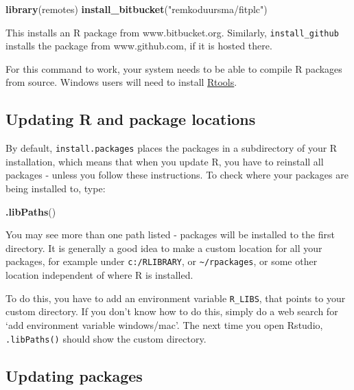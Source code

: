 \documentclass[]{book}
\newenvironment{Shaded}{\begin{snugshade}}{\end{snugshade}}
\newcommand{\KeywordTok}[1]{\textcolor[rgb]{0.13,0.29,0.53}{\textbf{#1}}}
\newcommand{\NormalTok}[1]{#1}
\newcommand{\StringTok}[1]{\textcolor[rgb]{0.31,0.60,0.02}{#1}}
\begin{document}
\begin{Shaded}
\begin{Highlighting}[]
\KeywordTok{library}\NormalTok{(remotes)}
\KeywordTok{install_bitbucket}\NormalTok{(}\StringTok{"remkoduursma/fitplc"}\NormalTok{)}
\end{Highlighting}
\end{Shaded}

This installs an R package from www.bitbucket.org. Similarly, \texttt{install\_github} installs the package from www.github.com, if it is hosted there.

For this command to work, your system needs to be able to compile R packages from source. Windows users will need to install \href{https://cran.r-project.org/bin/windows/Rtools/}{Rtools}.

\hypertarget{updating-r-and-package-locations}{%
\subsection{Updating R and package locations}\label{updating-r-and-package-locations}}

By default, \texttt{install.packages} places the packages in a subdirectory of your R installation, which means that when you update R, you have to reinstall all packages - unless you follow these instructions. To check where your packages are being installed to, type:

\begin{Shaded}
\begin{Highlighting}[]
\KeywordTok{.libPaths}\NormalTok{()}
\end{Highlighting}
\end{Shaded}

You may see more than one path listed - packages will be installed to the first directory. It is generally a good idea to make a custom location for all your packages, for example under \texttt{c:/RLIBRARY}, or \texttt{\textasciitilde{}/rpackages}, or some other location independent of where R is installed.

To do this, you have to add an environment variable \texttt{R\_LIBS}, that points to your custom directory. If you don't know how to do this, simply do a web search for `add environment variable windows/mac'. The next time you open Rstudio, \texttt{.libPaths()} should show the custom directory.

\hypertarget{updatingpackages}{%
\subsection{Updating packages}\label{updatingpackages}}
\end{document}
